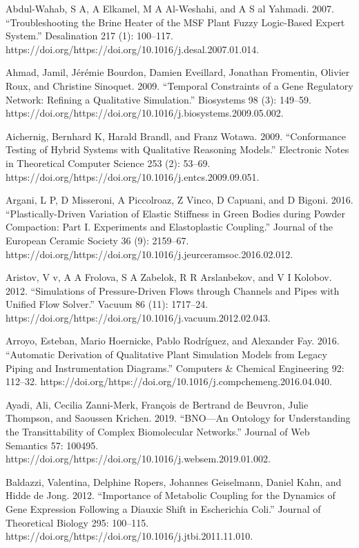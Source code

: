 \documentclass[utf8]{gradu3}
\begin{document}
Abdul-Wahab, S A, A Elkamel, M A Al-Weshahi, and A S al Yahmadi. 2007. “Troubleshooting the Brine Heater of the MSF Plant Fuzzy Logic-Based Expert System.” Desalination 217 (1): 100–117. https://doi.org/https://doi.org/10.1016/j.desal.2007.01.014.

Ahmad, Jamil, Jérémie Bourdon, Damien Eveillard, Jonathan Fromentin, Olivier Roux, 
and Christine Sinoquet. 2009. 
“Temporal Constraints of a Gene Regulatory Network: 
Refining a Qualitative Simulation.” Biosystems 98 (3): 149–59.
https://doi.org/https://doi.org/10.1016/j.biosystems.2009.05.002.

Aichernig, Bernhard K, Harald Brandl, and Franz Wotawa. 2009. “Conformance Testing of Hybrid Systems with Qualitative Reasoning Models.” Electronic Notes in Theoretical Computer Science 253 (2): 53–69. https://doi.org/https://doi.org/10.1016/j.entcs.2009.09.051.

Argani, L P, D Misseroni, A Piccolroaz, Z Vinco, D Capuani, and D Bigoni. 2016. “Plastically-Driven Variation of Elastic Stiffness in Green Bodies during Powder Compaction: Part I. Experiments and Elastoplastic Coupling.” Journal of the European Ceramic Society 36 (9): 2159–67. https://doi.org/https://doi.org/10.1016/j.jeurceramsoc.2016.02.012.

Aristov, V v, A A Frolova, S A Zabelok, R R Arslanbekov, and V I Kolobov. 2012. “Simulations of Pressure-Driven Flows through Channels and Pipes with Unified Flow Solver.” Vacuum 86 (11): 1717–24. https://doi.org/https://doi.org/10.1016/j.vacuum.2012.02.043.

Arroyo, Esteban, Mario Hoernicke, Pablo Rodríguez, and Alexander Fay. 2016. “Automatic Derivation of Qualitative Plant Simulation Models from Legacy Piping and Instrumentation Diagrams.” Computers \& Chemical Engineering 92: 112–32. https://doi.org/https://doi.org/10.1016/j.compchemeng.2016.04.040.

Ayadi, Ali, Cecilia Zanni-Merk, François de Bertrand de Beuvron, Julie Thompson, and Saoussen Krichen. 2019. “BNO—An Ontology for Understanding the Transittability of Complex Biomolecular Networks.” Journal of Web Semantics 57: 100495. https://doi.org/https://doi.org/10.1016/j.websem.2019.01.002.

Baldazzi, Valentina, Delphine Ropers, Johannes Geiselmann, Daniel Kahn, and Hidde de Jong. 2012. “Importance of Metabolic Coupling for the Dynamics of Gene Expression Following a Diauxic Shift in Escherichia Coli.” Journal of Theoretical Biology 295: 100–115. https://doi.org/https://doi.org/10.1016/j.jtbi.2011.11.010.
\end{document}
